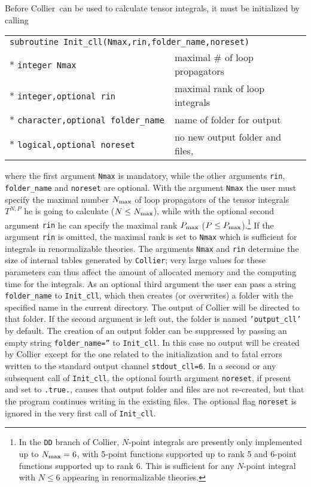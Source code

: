\documentclass[preprint,sort&compress,12pt]{elsarticle}
\makeatletter
\def\bce{\begin{center}}
\def\ece{\end{center}}
\newcommand{\collier}{{\sc Collier}}
\newlength{\parwidth}\newlength{\colonewidth}%
\newlength{\restpageheight}
\newcommand{\cpcsuptable}[2]
{\settowidth{\colonewidth}{#1}\setlength{\parwidth}{\textwidth}%
\addtolength{\parwidth}{-\colonewidth}\addtolength{\parwidth}{-3em}%
\bce
\setlength{\restpageheight}{\@colroom}\addtolength{\restpageheight}{-\pagetotal}
\ifdim \restpageheight<20pt \pagebreak\fi
\begin{supertabular}[l]{p{\colonewidth}@{ }c@{ }p{\parwidth}}
#2
\end{supertabular}%
\ece
}%
\renewcommand{\cpcsuptable}[2]%
{\settowidth{\colonewidth}{#1}\setlength{\parwidth}{\textwidth}%
\addtolength{\parwidth}{-\colonewidth}\addtolength{\parwidth}{-3em}%
\begin{center}
\setlength{\restpageheight}{\@colroom}\addtolength{\restpageheight}{-\pagetotal}%
\ifdim \restpageheight<20pt \pagebreak\fi
\begin{supertabular}[l]{p{\colonewidth}@{ : }p{\parwidth}}%
#2
\end{supertabular}%
\end{center}
}%
\makeatother
\begin{document}
Before \collier\ can be used to calculate tensor integrals, it must be initialized by calling 
\cpcsuptable{character,optional folder\_name xxxx}{%
  \multicolumn{2}{l}{\tt subroutine  Init\_cll(Nmax,rin,folder\_name,noreset)}\\*
  \tt integer Nmax & maximal $\#$ of loop propagators\\*
  \tt integer,optional rin & maximal rank of loop integrals\\*
  \tt character,optional folder\_name & name of folder for output \\*
  \tt logical,optional noreset & no new output folder and files\;,\\
  } 
where the first argument {\tt Nmax} is mandatory, while the other
arguments {\tt rin}, 
{\tt folder\_name} and {\tt noreset} are optional.  With the
argument {\tt Nmax} the user must specify the maximal number $N_{\rm
  max}$ of loop propagators of the tensor integrals $T^{N,P}$ he is going
to calculate ($N\le N_{\rm max}$),
while with the optional second argument {\tt rin} he can specify the maximal
rank $P_{\rm max}$ ($P\le P_{\rm max}$).\footnote{In the {\tt DD} branch of \collier, 
$N$-point integrals are presently only implemented up to $N_{\rm max}=6$, with
5-point functions supported up to rank 5 and 6-point functions supported up to rank 6.
This is sufficient for any $N$-point integral with $N\le 6$ appearing 
in renormalizable theories.}
 If the argument {\tt rin} is omitted, the maximal rank is set to
{\tt Nmax} which is sufficient for integrals in renormalizable theories.
The arguments {\tt Nmax} and {\tt rin} determine the size of internal tables
generated by {\tt Collier}; very large values for these parameters can thus affect the amount 
of allocated memory and the computing time for the integrals. 
As an optional third argument 
the user can pass a string {\tt
folder\_name} to {\tt Init\_cll}, which then creates (or overwrites)
a folder with the specified name in the current directory. The output
of {\collier} will be directed to that folder. If the second
argument is left out, the folder is named {\tt 'output\_cll'} by
default. The creation of an output folder can be suppressed by passing
an empty string {\tt folder\_name=''} to {\tt Init\_cll}. In this case
no output will be created by \collier\ except for the one related to
the initialization and to fatal errors written to the standard output
channel {\tt stdout\_cll=6}. In a second or any subsequent call of
{\tt Init\_cll}, the optional fourth argument {\tt noreset}, 
if present
and set to {\tt .true.}, causes that output folder and files are not
re-created, but that the program continues writing in the existing
files. The optional flag {\tt noreset} is ignored in the very first
call of {\tt Init\_cll}.
\end{document}
